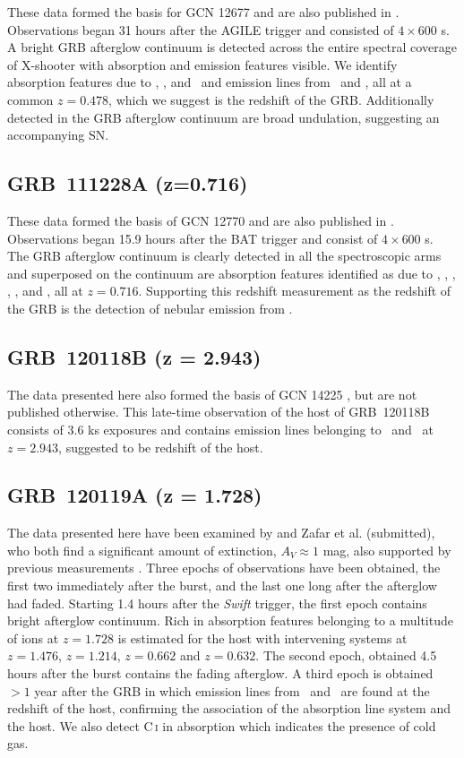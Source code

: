 \documentclass[longauth]{aa}    %
\begin{document}
These data formed the basis for GCN 12677 \citep{GCN12677} and are also
published in \cite{Kruhler2015}. Observations began 31 hours after the AGILE
trigger and consisted of $4 \times 600$ s. A bright GRB afterglow continuum is
detected across the entire spectral coverage of X-shooter with absorption and
emission features visible. We identify absorption features due to \feii, \mgii,
and \caii~and emission lines from \oiii~and \ha, all at a common $z = 0.478$,
which we suggest is the redshift of the GRB. Additionally detected in the GRB
afterglow continuum are broad undulation, suggesting an accompanying SN.

\subsection{GRB~111228A (z=0.716)} \label{111228}

These data formed the basis of GCN 12770 \citep{GCN12770} and are also published
in \cite{Kruhler2015}. Observations began 15.9 hours after the BAT trigger and
consist of $4 \times 600$ s. The GRB afterglow continuum is clearly detected in
all the spectroscopic arms and superposed on the continuum are absorption
features identified as due to \feii, \mnii, \mgii, \mgi, \cah, and \cak, all at
$z = 0.716$. Supporting this redshift measurement as the redshift of the GRB is
the detection of nebular emission from \oiii.

\subsection{GRB~120118B (z = 2.943)} \label{120118}

The data presented here also formed the basis of GCN 14225 \citep{GCN14225}, but
are not published otherwise. This late-time observation of the host of
GRB~120118B consists of 3.6 ks exposures and contains emission lines belonging
to \oii~and \oiii~at $z = 2.943$, suggested to be redshift of the host.

\subsection{GRB~120119A (z = 1.728)} \label{120119}

The data presented here have been examined by \citet{Japelj2015} and Zafar et al.
(submitted), who both find a significant amount of extinction, $A_V\approx 1$
mag, also supported by previous measurements \citep{Morgan2014a}. Three epochs
of observations have been obtained, the first two immediately after the burst,
and the last one long after the afterglow had faded. Starting 1.4 hours after
the \textit{Swift} trigger, the first epoch contains bright afterglow continuum.
Rich in absorption features belonging to a multitude of ions at $z = 1.728$ is
estimated for the host with intervening systems at $z = 1.476$, $z = 1.214$, $z
= 0.662$ and $z = 0.632$. The second epoch, obtained 4.5 hours after the burst
contains the fading afterglow. A third epoch is obtained $>1$ year after the GRB
in which emission lines from \hb~and \ha~are found at the redshift of the host,
confirming the association of the absorption line system and the host. We also
detect C\,\textsc{i} in absorption which indicates the presence of cold gas.
\end{document}
